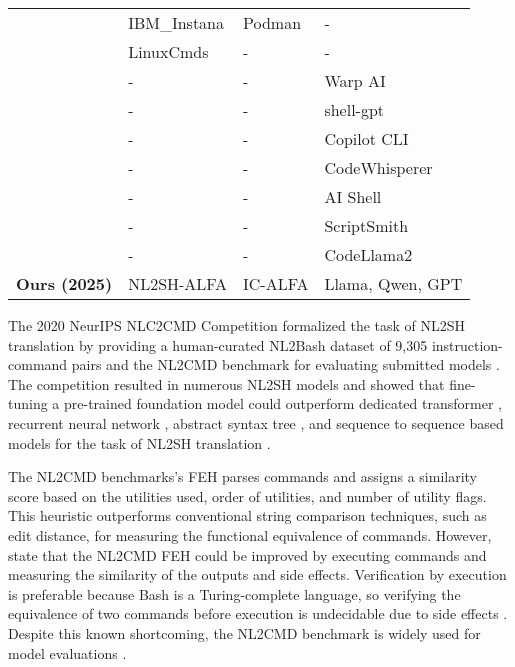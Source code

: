 \begin{table}[ht!]
\begin{tabular}{llll}
    \citet{exec_based_eval} & IBM\_Instana      & Podman        & -                \\
    \citet{dataset3}        & LinuxCmds         & -             & -                \\
    \citet{warp}            & -                 & -             & Warp AI          \\
    \citet{shell-gpt}       & -                 & -             & shell-gpt        \\
    \citet{copilot}         & -                 & -             & Copilot CLI      \\
    \citet{cwai}            & -                 & -             & CodeWhisperer    \\
    \citet{msai}            & -                 & -             & AI Shell         \\
    \citet{scriptsmith}     & -                 & -             & ScriptSmith      \\
    \citet{bash-assistant}  & -                 & -             & CodeLlama2       \\ \hline
    \textbf{Ours (2025)}    & NL2SH-ALFA        & IC-ALFA       & Llama, Qwen, GPT \\ \hline
  \end{tabular}
  \label{tab:related}
\end{table}

The 2020 NeurIPS NLC2CMD Competition formalized the task of NL2SH translation by providing a human-curated NL2Bash dataset of 9,305 instruction-command pairs and the NL2CMD benchmark for evaluating submitted models \cite{NL2Bash, NL2CMD-Comp}. The competition resulted in numerous NL2SH models and showed that fine-tuning a pre-trained foundation model could outperform dedicated transformer \cite{Magnum}, recurrent neural network \cite{Tellina}, abstract syntax tree \cite{AST}, and sequence to sequence \cite{AInix} based models for the task of NL2SH translation \cite{ShellGPT}.

The NL2CMD benchmarks's FEH parses commands and assigns a similarity score based on the utilities used, order of utilities, and number of utility flags. This heuristic outperforms conventional string comparison techniques, such as edit distance, for measuring the functional equivalence of commands. However, \citet{NL2CMD-Comp} state that the NL2CMD FEH could be improved by executing commands and measuring the similarity of the outputs and side effects. Verification by execution is preferable because Bash is a Turing-complete language, so verifying the equivalence of two commands before execution is undecidable due to side effects \cite{undecided}. Despite this known shortcoming, the NL2CMD benchmark is widely used for model evaluations \cite{NL2CMD}.


